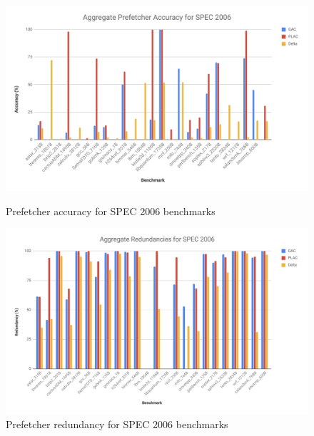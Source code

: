 \documentclass[conference]{IEEEtran}
\begin{document}
    \begin{figure}[h] %
        \centering
            \includegraphics[width=.95\textwidth]{aggregate_accuracy.png}
        \caption{Prefetcher accuracy for SPEC 2006 benchmarks}
        \vspace*{\floatsep}
        \vspace*{\floatsep}
        \centering
            \includegraphics[width=.95\textwidth]{aggregate_redundancy.png}
        \caption{Prefetcher redundancy for SPEC 2006 benchmarks}
        \vspace*{\floatsep}
    \end{figure}
    
\end{document}
